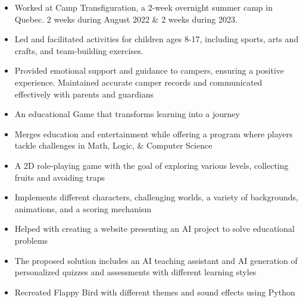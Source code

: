 \documentclass[10pt,a4paper,ragged2e,withhyper]{altacv}
\begin{document}
\begin{paracol}{2}
\begin{itemize}
    \item Worked at Camp Transfiguration, a 2-week overnight summer camp in Quebec. 2 weeks during August 2022 \& 2 weeks during 2023. 
    \item Led and facilitated activities for children ages 8-17, including sports, arts and crafts, and team-building exercises. 
    \item Provided emotional support and guidance to campers, ensuring a positive experience. Maintained accurate camper records and communicated effectively with parents and guardians
\end{itemize}


\switchcolumn



\begin{itemize}
    \item An educational Game that transforms learning into a journey 
    \item Merges education and entertainment while offering a program where players tackle challenges in Math, Logic, \& Computer Science
\end{itemize}

\begin{itemize}
    \item A 2D role-playing game with the goal of exploring various levels, collecting fruits and avoiding traps
    \item Implements different characters, challenging worlds, a variety of backgrounds, animations, and a scoring mechanism 
\end{itemize}

\begin{itemize}
    \item Helped with creating a website presenting an AI project to solve educational problems
    \item The proposed solution includes an AI teaching assistant and AI generation of personalized quizzes and assessments with different learning styles
\end{itemize}

\begin{itemize}
    \item Recreated Flappy Bird with different themes and sound effects using Python
\end{itemize}



\end{paracol}
\end{document}
